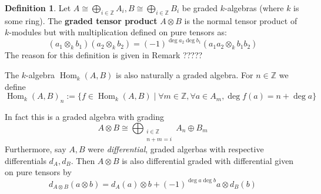 \documentclass[12pt]{article}
\theoremstyle{plain}
\theoremstyle{definition}
\newtheorem{defn}[thm]{Definition} %
\newcommand{\bb}[1]{\mathbb{#1}}
\begin{document}
\begin{defn}
Let $A \cong \bigoplus_{i \in \bb{Z}}A_i,B \cong \bigoplus_{i \in \bb{Z}}B_i$ be graded $k$-algebras (where $k$ is some ring). The \textbf{graded tensor product} $A \otimes B$ is the normal tensor product of $k$-modules but with multiplication defined on pure tensors as:
\begin{equation}
(a_1\otimes_k b_1)(a_2 \otimes_k b_2) = (-1)^{\operatorname{deg}a_2\operatorname{deg}b_1}(a_1a_2 \otimes_k b_1b_2)
\end{equation}
The reason for this definition is given in Remark ?????

The $k$-algebra $\operatorname{Hom}_k(A,B)$ is also naturally a graded algebra. For $n \in \bb{Z}$ we define
\begin{equation}
\operatorname{Hom}_k(A,B)_n := \lbrace f \in \operatorname{Hom}_k(A,B) \mid \forall m \in \bb{Z}, \forall a \in A_m, \operatorname{deg}f(a) = n + \operatorname{deg}a\rbrace
\end{equation}

In fact this is a graded algebra with grading
\begin{equation}
A \otimes B \cong \bigoplus_{\substack{i \in \bb{Z}\\ n + m = i}}A_n \oplus B_m
\end{equation}
Furthermore, say $A,B$ were \emph{differential}, graded algerbas with respective differentials $d_A,d_B$.  Then $A \otimes B$ is also differential graded with differential given on pure tensors by
\begin{equation}
d_{A \otimes B}(a \otimes b) = d_A(a) \otimes b + (-1)^{\operatorname{deg}a\operatorname{deg}b}a \otimes d_B(b)
\end{equation}
\end{defn}
\end{document}
